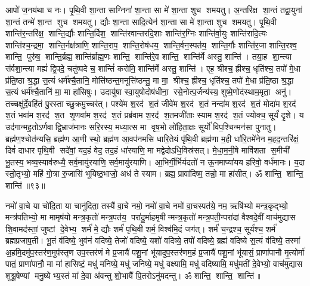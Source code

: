आपो॑ ज॒नय॑था च नः। पृ॒थि॒वी शा॒न्ता साग्निना॑ शा॒न्ता सा मे॑ शा॒न्ता शुच शमयतु। अ॒न्तरि॑क्ष शा॒न्तं तद्वा॒युना॑ शा॒न्तं तन्मे॑ शा॒न्त शुच शमयतु। द्यौः  शा॒न्ता सादि॒त्येन॑ शा॒न्ता सा मे॑ शा॒न्ता शुच शमयतु। पृ॒थि॒वी शान्ति॑र॒न्तरि॑क्ष॒ शान्ति॒र्द्यौः  शान्ति॒र्दिश॒ शान्ति॑रवान्तरदि॒शाः  शान्ति॑र॒ग्निः  शान्ति॑र्वा॒युः  शान्ति॑रादि॒त्यः  शान्ति॑श्च॒न्द्रमा॒ शान्ति॒र्नक्ष॑त्राणि॒ शान्ति॒राप॒ शान्ति॒रोष॑धय॒ शान्ति॒र्वन॒स्पत॑य॒ शान्ति॒र्गौः  शान्ति॑र॒जा शान्ति॒रश्व॒ शान्ति॒ पुरु॑ष॒ शान्ति॒र्ब्रह्म॒ शान्ति॑र्ब्राह्म॒णः  शान्ति॒ शान्ति॑रे॒व शान्ति॒ शान्ति॑र्मे अस्तु॒ शान्ति॑। तया॒ह शा॒न्त्या स॑र्वशा॒न्त्या मह्यं॑ द्वि॒पदे॒ चतु॑ष्पदे च॒ शान्तिं॑ करोमि॒ शान्ति॑र्मे अस्तु॒ शान्ति॑। एह॒ श्रीश्च॒ ह्रीश्च॒ धृति॑श्च॒ तपो॑ मे॒धा प्र॑ति॒ष्ठा श्र॒द्धा स॒त्यं धर्म॑श्चै॒तानि॒ मोत्ति॑ष्ठन्त॒मनूत्ति॑ष्ठन्तु॒ मा मा॒ श्रीश्च॒ ह्रीश्च॒ धृति॑श्च॒ तपो॑ मे॒धा प्र॑ति॒ष्ठा श्र॒द्धा स॒त्यं धर्म॑श्चै॒तानि॑ मा॒ मा हा॑सिषुः। उदायु॑षा स्वा॒युषोदोष॑धीना॒ रसे॒नोत्प॒र्जन्य॑स्य॒ शुष्मे॒णोद॑स्थाम॒मृता॒ अनु॑। तच्चक्षु॑र्दे॒वहि॑तं पु॒रस्ताच्छु॒क्रमु॒च्चर॑त्। पश्ये॑म श॒रद॑ श॒तं जीवे॑म श॒रद॑ श॒तं नन्दा॑म श॒रद॑ श॒तं मोदा॑म श॒रद॑ श॒तं भवा॑म श॒रद॑ श॒त शृ॒णवा॑म श॒रद॑ श॒तं प्रब्र॑वाम श॒रद॑ श॒तमजी॑ताः स्याम श॒रद॑ श॒तं ज्योक्च॒ सूर्यं॑ दृ॒शे। य उद॑गान्मह॒तोऽर्णवाद्वि॒भ्राज॑मानः सरि॒रस्य॒ मध्या॒त्स मा वृष॒भो लो॑हिता॒क्षः सूर्यो॑ विप॒श्चिन्मन॑सा पुनातु। ब्रह्म॑ण॒श्चोत॑न्यसि॒ ब्रह्म॑ण आ॒णी स्थो॒ ब्रह्म॑ण आ॒वप॑नमसि धारि॒तेयं पृ॑थि॒वी ब्रह्म॑णा म॒ही धा॑रि॒तमे॑नेन म॒हद॒न्तरि॑क्षं॒ दिवं॑ दाधार पृथि॒वी सदे॑वां॒ यद॒हं वेद॒ तद॒हं धा॑रयाणि॒ मा मद्वेदोऽधि॒विस्र॑सत्। मे॒धा॒म॒नी॒षे मावि॑शता स॒मीची॑ भू॒तस्य॒ भव्य॒स्याव॑रुध्यै॒ सर्व॒मायु॑रयाणि॒ सर्व॒मायु॑रयाणि। आ॒भिर्गी॒र्भिर्यदतो॑ न ऊ॒नमाप्या॑यय हरिवो॒ वर्ध॑मानः। य॒दा स्तो॒तृभ्यो॒ महि॑ गो॒त्रा रु॒जासि॑ भूयिष्ठ॒भाजो॒ अध॑ ते स्याम। ब्रह्म॒ प्रावा॑दिष्म॒ तन्नो॒ मा हा॑सीत्। ॐ शान्ति॒ शान्ति॒ शान्ति॑॥९३॥\anuvakamend[प॒रा॒वतो॑ दधातु ब॒द्धां जिन्व॑थ दृ॒शे स॒प्त च॑]

नमो॑ वा॒चे या चो॑दि॒ता या चानु॑दिता॒ तस्यै॑ वा॒चे नमो॒ नमो॑ वा॒चे नमो॑ वा॒चस्पत॑ये॒ नम॒ ऋषि॑भ्यो मन्त्र॒कृद्भ्यो॒ मन्त्र॑पतिभ्यो॒ मा मामृष॑यो मन्त्र॒कृतो॑ मन्त्र॒पत॑य॒ परा॑दु॒र्माहमृषीन्मन्त्र॒कृतो॑ मन्त्र॒पती॒न्परा॑दां वैश्वदे॒वीं वाच॑मुद्यास शि॒वामद॑स्तां॒ जुष्टां दे॒वेभ्य॒ शर्म॑ मे॒ द्यौः  शर्म॑ पृथि॒वी शर्म॒ विश्व॑मि॒दं जग॑त्। शर्म॑ च॒न्द्रश्च॒ सूर्य॑श्च॒ शर्म॑ ब्रह्मप्रजाप॒ती। भू॒तं व॑दिष्ये॒ भुव॑नं वदिष्ये॒ तेजो॑ वदिष्ये॒ यशो॑ वदिष्ये॒ तपो॑ वदिष्ये॒ ब्रह्म॑ वदिष्ये स॒त्यं व॑दिष्ये॒ तस्मा॑ अ॒हमि॒दमु॑प॒स्तर॑ण॒मुप॑स्तृण उप॒स्तर॑णं मे प्र॒जायै॑ पशू॒नां भू॑यादुप॒स्तर॑णम॒हं प्र॒जायै॑ पशू॒नां भू॑यासं॒ प्राणा॑पानौ मृ॒त्योर्मा॑ पातं॒ प्राणा॑पानौ॒ मा मा॑ हासिष्टं॒ मधु॑ मनिष्ये॒ मधु॑ जनिष्ये॒ मधु॑ वक्ष्यामि॒ मधु॑ वदिष्यामि॒ मधु॑मतीं दे॒वेभ्यो॒ वाच॑मुद्यास शुश्रू॒षेण्यां मनु॒ष्येभ्य॒स्तं मा॑ दे॒वा अ॑वन्तु शो॒भायै॑ पि॒तरोऽनु॑मदन्तु। ॐ शान्ति॒ शान्ति॒ शान्ति॑॥ 

\closesection